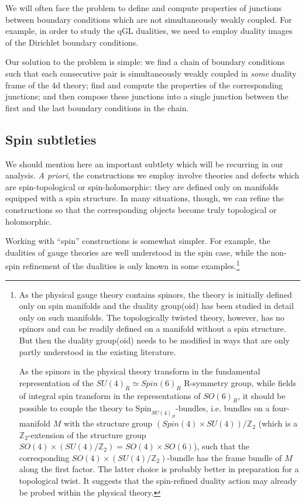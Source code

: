 \documentclass[11pt,reqno]{amsart}
\theoremstyle{plain}
\numberwithin{equation}{section}
\newcommand{\Z}{\mathbb{Z}}
\theoremstyle{definition}
\begin{document}
We will often face the problem to define and compute properties of
junctions between boundary conditions which are not simultaneously
weakly coupled.  For example, in order to study the qGL dualities, we
need to employ duality images of the Dirichlet boundary conditions.

Our solution to the problem is simple: we find a chain of boundary
conditions such that each consecutive pair is simultaneously weakly
coupled in {\it some} duality frame of the 4d theory; find and compute
the properties of the corresponding junctions; and then compose these
junctions into a single junction between the first and the last
boundary conditions in the chain.

\subsection{Spin subtleties}

We should mention here an important subtlety which will be recurring
in our analysis. {\em A priori}, the constructions we employ involve
theories and defects which are spin-topological or spin-holomorphic:
they are defined only on manifolds equipped with a spin structure. In
many situations, though, we can refine the constructions so that the
corresponding objects become truly topological or holomorphic.

Working with ``spin'' constructions is somewhat simpler. For example,
the dualities of gauge theories are well understood in the spin case,
while the non-spin refinement of the dualities is only known in some
examples.\footnote{As the physical gauge theory contains spinors, the
  theory is initially defined only on spin manifolds and the duality
  group(oid) has been studied in detail only on such manifolds. The
  topologically twisted theory, however, has no spinors and can be
  readily defined on a manifold without a spin structure. But then the
  duality group(oid) needs to be modified in ways that are only
  partly understood in the existing literature.

As the spinors in the physical theory transform in the
fundamental representation of the $SU(4)_R\simeq Spin(6)_R$ R-symmetry
group, while fields of integral spin transform in the representations
of $SO(6)_R$, it should be possible to couple the theory to
$\mathrm{Spin}_{SU(4)_R}$-bundles, i.e. bundles on a four-manifold $M$
with the structure group $(Spin(4) \times SU(4))/\Z_2$ (which is a
$\Z_2$-extension of the structure group $SO(4) \times (SU(4)/\Z_2) =
SO(4) \times SO(6)$), such that the corresponding $SO(4) \times
(SU(4)/\Z_2)$-bundle has the frame bundle of $M$ along the first
factor. The latter choice is probably better in preparation
for a topological twist. It suggests that the spin-refined duality
action may already be probed within the physical theory.}
\end{document}
